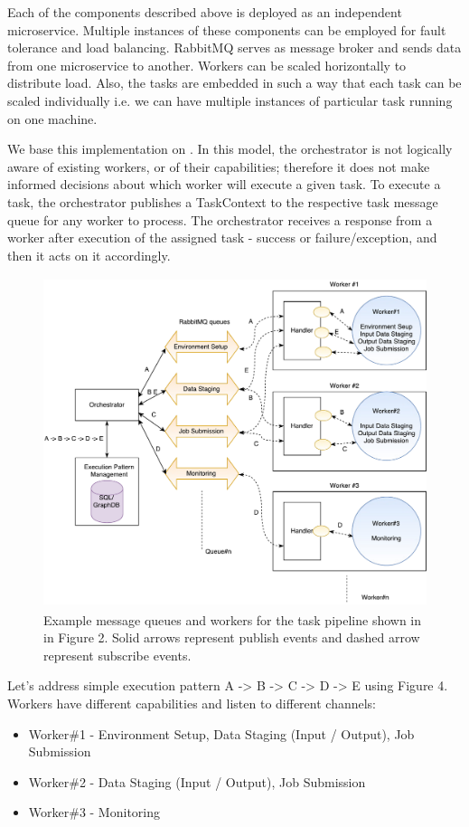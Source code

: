 \documentclass[review]{elsarticle}
\begin{document}
Each of the components described above is deployed as an independent microservice. Multiple instances of these components can be employed for fault tolerance and load balancing. RabbitMQ serves as message broker and sends data from one microservice to another.  Workers can be scaled horizontally to distribute load. Also, the tasks are embedded in such a way that each task can be scaled individually i.e. we can have multiple instances of particular task running on one machine. 

We base this implementation on \cite{sadooghi2014achieving}. In this model, the orchestrator is not logically aware of existing workers, or of their capabilities; therefore it does not make informed decisions about which worker will execute a given task.  To execute a task, the orchestrator publishes a TaskContext to the respective task message queue for any worker to process. The orchestrator receives a response from a worker after execution of the assigned task - success or failure/exception, and then it acts on it accordingly.  

\begin{figure}
\includegraphics[height=3.8in, width=4.8 in]{figures/figure4.pdf}
\caption{Example message queues and workers for the task pipeline shown in in Figure 2. Solid arrows represent publish events and dashed arrow represent subscribe events.}
\end{figure}

Let's address simple execution pattern A -> B -> C -> D -> E using Figure 4.  Workers have different capabilities and listen to different channels:
\begin{itemize}
\item Worker\#1 - Environment Setup, Data Staging (Input / Output), Job Submission
\item Worker\#2 - Data Staging (Input / Output), Job Submission
\item Worker\#3 - Monitoring
\end{itemize}
\end{document}
